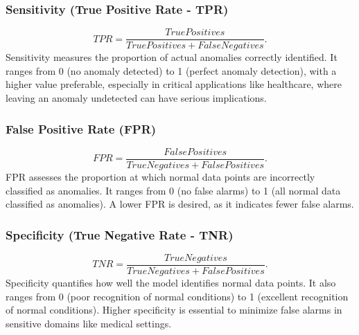 \subsubsection{Sensitivity (True Positive Rate - TPR)}
\[ TPR=\frac{TruePositives}{TruePositives+FalseNegatives}. \]
Sensitivity measures the proportion of actual anomalies correctly identified. It ranges from 0 (no anomaly detected) to 1 (perfect anomaly detection), with a higher value preferable, especially in critical applications like healthcare, where leaving an anomaly undetected can have serious implications.

\subsubsection{False Positive Rate (FPR)}
\[ FPR=\frac{FalsePositives}{TrueNegatives+FalsePositives}. \]
FPR assesses the proportion at which normal data points are incorrectly classified as anomalies. It ranges from 0 (no false alarms) to 1 (all normal data classified as anomalies). A lower FPR is desired, as it indicates fewer false alarms.

\subsubsection{Specificity (True Negative Rate - TNR)}
\[ TNR=\frac{TrueNegatives}{TrueNegatives+FalsePositives} .\]
Specificity quantifies how well the model identifies normal data points. It also ranges from 0 (poor recognition of normal conditions) to 1 (excellent recognition of normal conditions). Higher specificity is essential to minimize false alarms in sensitive domains like medical settings.

